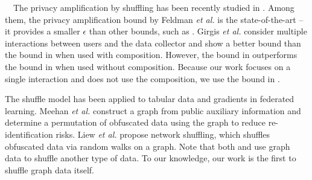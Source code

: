 

\smallskip
{}~~The privacy amplification by shuffling has been recently studied in \cite{Balle_CRYPTO19,Cheu_EUROCRYPT19,Erlingsson_SODA19,Feldman_FOCS21}. 
Among them, the privacy amplification bound by Feldman \textit{et al.} \cite{Feldman_FOCS21} is the state-of-the-art -- it provides a smaller $\epsilon$ than other bounds, such as \cite{Balle_CRYPTO19,Cheu_EUROCRYPT19,Erlingsson_SODA19}. 
Girgis \textit{et al.} \cite{Girgis_CCS21} 
consider multiple interactions between users and the data collector and 
show a better bound than the bound in \cite{Feldman_FOCS21} when used with composition. 
However, the bound in \cite{Feldman_FOCS21} outperforms the bound in \cite{Girgis_CCS21} when used without composition. 
Because our work focuses on a single interaction and does not use the composition, 
we use the bound in \cite{Feldman_FOCS21}. 

The shuffle model has been applied to tabular data \cite{Meehan_ICLR22,Wang_PVLDB20} and gradients \cite{Girgis_AISTATS21,Liu_AAAI21} in federated learning. 
Meehan \textit{et al.} \cite{Meehan_ICLR22} construct a graph from public auxiliary information and determine a permutation of obfuscated data using the graph to reduce re-identification risks. 
Liew \textit{et al.} \cite{Liew_SIGMOD22} propose network shuffling, which shuffles obfuscated data via random walks on a graph. 
Note that both \cite{Meehan_ICLR22} and \cite{Liew_SIGMOD22} use graph data to shuffle another type of data. 
To our knowledge, our work is the first to shuffle graph data itself. 
